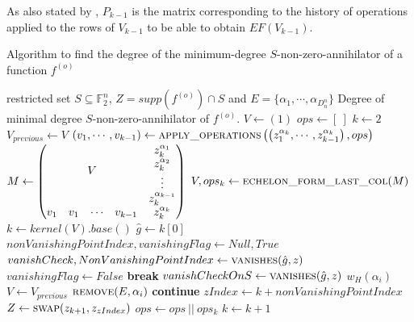 \documentclass[11pt]{llncs}
\begin{document}
\begin{remark}\label{rem:historyOfOperations}
    As also stated by \cite{armknecht2006efficient}, $P_{k-1}$ is the matrix corresponding to the history of operations applied to the rows of $V_{k-1}$ to be able to obtain $EF\left(V_{k-1}\right)$.
\end{remark}

\begin{algorithm}
	\caption{Algorithm to find the degree of the minimum-degree $S$-non-zero-annihilator of a function $f^{(o)}$}\label{alg:MinDegreeSnonZeroAnnihilatorIterative}
	\begin{algorithmic}[1]
		\Require restricted set $S\subseteq \mathbb{F}_2^n$, $Z = supp\left(f^{(o)}\right) \cap S$ and $E = \{\alpha_1, \cdots, \alpha_{D_n^n}\}$
		\Ensure Degree of minimal degree $S$-non-zero-annihilator of $f^{(o)}$.
		\State
		\State $V\gets (1)$
		\State $ops \gets [\ ]$
		\State $k \gets 2$
		\State $V_{previous} \gets V$
		\State $\left(v_1, \cdots, v_{k-1}\right) \gets \mbox{\textsc{apply\_operations}}\left(\left(z_1^{\alpha_k}, \cdots, z_{k-1}^{\alpha_k}\right), ops\right)$
		\State  $M \gets \begin{pmatrix}
		\multicolumn{4}{c}{\multirow{4}{*}{$V$}} & z_k^{\alpha_1}\\
		& & & & z_k^{\alpha_2}\\
		& & & & \vdots\\
		& & & & z_k^{\alpha_{k-1}}\\
		v_1 & v_1& \cdots & v_{k-1} & z_k^{\alpha_k}
		\end{pmatrix}$
		\State $V, ops_k\gets \mbox{\textsc{echelon\_form\_last\_col}}(M)$
		\State $k \gets kernel\left(V\right).base()$
		\State $\hat{g} \gets k[0]$
		\State $nonVanishingPointIndex, vanishingFlag \gets Null, True$
		\State $vanishCheck, NonVanishingPointIndex \gets \mbox{\textsc{vanishes}}(\hat{g}, z)$
		\State $vanishingFlag \gets False$
		\State \textbf{break}
		\EndIf
		\State $vanishCheckOnS \gets \mbox{\textsc{vanishes}}(\hat{g}, z)$
		\State \Return $w_H\left(\alpha_i\right)$
		\EndIf
		\EndFor
		\State $V\gets V_{previous}$
		\State $\mbox{\textsc{remove}}(E, \alpha_i)$
		\State \textbf{continue}
		\EndFor
		\State $zIndex \gets k+nonVanishingPointIndex$
		\State $Z \gets \mbox{\textsc{swap}}(z_{k+1}, z_{zIndex})$
		\State $ops\gets ops\ ||\ ops_k$
		\State $k\gets k+1$
		\EndIf
		\EndWhile
		\State {}
	\end{algorithmic}
\end{algorithm}
\end{document}
